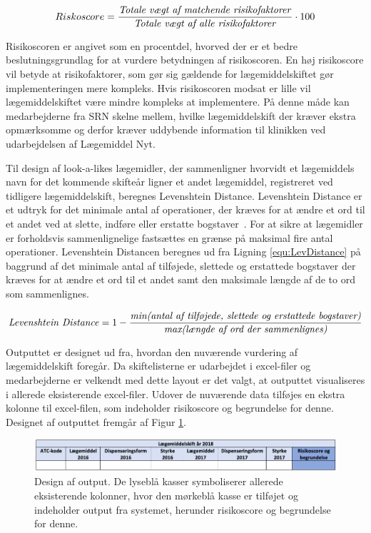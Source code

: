 \begin{equation}  \label{equ:risikoscore}
Riskoscore = \frac{\mbox{\textit{Totale vægt af matchende risikofaktorer}}}{\mbox{\textit{Totale vægt af alle risikofaktorer}}} \cdot 100
\end{equation}

Risikoscoren er angivet som en procentdel, hvorved der er et bedre beslutningsgrundlag for at vurdere betydningen af risikoscoren. En høj risikoscore vil betyde at risikofaktorer, som gør sig gældende for lægemiddelskiftet gør implementeringen mere kompleks. Hvis risikoscoren modsat er lille vil lægemiddelskiftet være mindre kompleks at implementere. På denne måde kan medarbejderne fra SRN skelne mellem, hvilke lægemiddelskift der kræver ekstra opmærksomme og derfor kræver uddybende information til klinikken ved udarbejdelsen af Lægemiddel Nyt.  

Til design af look-a-likes lægemidler, der sammenligner hvorvidt et lægemiddels navn for det kommende skifteår ligner et andet lægemiddel, registreret ved tidligere lægemiddelskift, beregnes Levenshtein Distance. Levenshtein Distance er et udtryk for det minimale antal af operationer, der kræves for at ændre et ord til et andet ved at slette, indføre eller erstatte bogstaver~\citep{Schepens2012}. For at sikre at lægemidler er forholdsvis sammenlignelige fastsættes en grænse på maksimal fire antal operationer. Levenshtein Distancen beregnes ud fra Ligning \ref{equ:LevDistance} på baggrund af det minimale antal af tilføjede, slettede og erstattede bogstaver der kræves for at ændre et ord til et andet samt den maksimale længde af de to ord som sammenlignes. 

\begin{equation} \label{equ:LevDistance}
\mbox{\textit{Levenshtein Distance}} = 1 - \frac{\mbox{\textit{min(antal af tilføjede, slettede og erstattede bogstaver)}}}{\mbox{\textit{max(længde af ord der sammenlignes)}}}   
\end{equation}

Outputtet er designet ud fra, hvordan den nuværende vurdering af lægemiddelskift foregår. Da skiftelisterne er udarbejdet i excel-filer og medarbejderne er velkendt med dette layout er det valgt, at outputtet visualiseres i allerede eksisterende excel-filer. Udover de nuværende data tilføjes en ekstra kolonne til excel-filen, som indeholder risikoscore og begrundelse for denne. Designet af outputtet fremgår af Figur \ref{fig:Output}.

\vspace{0.2cm}
\begin{figure}[H]\centering
\includegraphics[width=1\textwidth]{billeder/Output.png} 
	\caption{Design af output. De lyseblå kasser symboliserer allerede eksisterende kolonner, hvor den mørkeblå kasse er tilføjet og indeholder output fra systemet, herunder risikoscore og begrundelse for denne.}
	\label{fig:Output}  
\end{figure}

